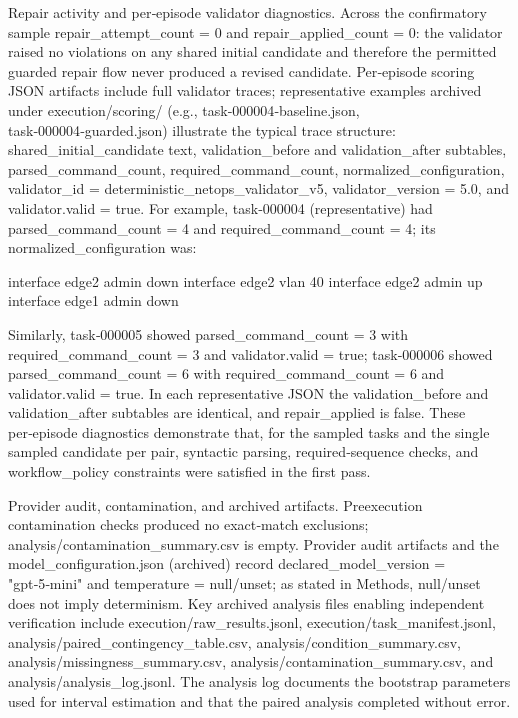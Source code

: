 \documentclass[conference]{IEEEtran}
\begin{document}
Repair activity and per‑episode validator diagnostics. Across the confirmatory sample repair\_attempt\_count = 0 and repair\_applied\_count = 0: the validator raised no violations on any shared initial candidate and therefore the permitted guarded repair flow never produced a revised candidate. Per‑episode scoring JSON artifacts include full validator traces; representative examples archived under execution/scoring/ (e.g., task‑000004‑baseline.json, task‑000004‑guarded.json) illustrate the typical trace structure: shared\_initial\_candidate text, validation\_before and validation\_after subtables, parsed\_command\_count, required\_command\_count, normalized\_configuration, validator\_id = deterministic\_netops\_validator\_v5, validator\_version = 5.0, and validator.valid = true. For example, task‑000004 (representative) had parsed\_command\_count = 4 and required\_command\_count = 4; its normalized\_configuration was:

interface edge2 admin down
interface edge2 vlan 40
interface edge2 admin up
interface edge1 admin down

Similarly, task‑000005 showed parsed\_command\_count = 3 with required\_command\_count = 3 and validator.valid = true; task‑000006 showed parsed\_command\_count = 6 with required\_command\_count = 6 and validator.valid = true. In each representative JSON the validation\_before and validation\_after subtables are identical, and repair\_applied is false. These per‑episode diagnostics demonstrate that, for the sampled tasks and the single sampled candidate per pair, syntactic parsing, required‑sequence checks, and workflow\_policy constraints were satisfied in the first pass.

Provider audit, contamination, and archived artifacts. Preexecution contamination checks produced no exact‑match exclusions; analysis/contamination\_summary.csv is empty. Provider audit artifacts and the model\_configuration.json (archived) record declared\_model\_version = "gpt‑5‑mini" and temperature = null/unset; as stated in Methods, null/unset does not imply determinism. Key archived analysis files enabling independent verification include execution/raw\_results.jsonl, execution/task\_manifest.jsonl, analysis/paired\_contingency\_table.csv, analysis/condition\_summary.csv, analysis/missingness\_summary.csv, analysis/contamination\_summary.csv, and analysis/analysis\_log.jsonl. The analysis log documents the bootstrap parameters used for interval estimation and that the paired analysis completed without error.
\end{document}
